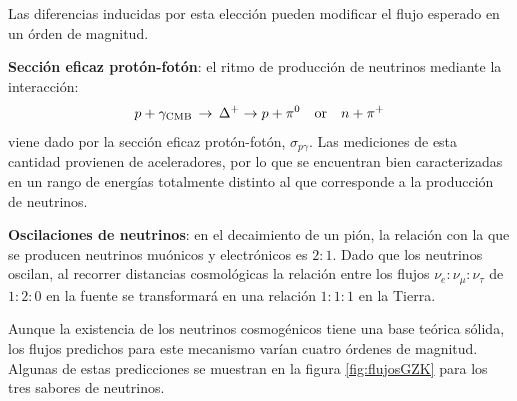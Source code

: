 	Las diferencias inducidas por esta elecci\'on pueden modificar el flujo esperado en un \'orden de magnitud.
	
	\textbf{Secci\'on eficaz protón-fot\'on}: el ritmo de producci\'on de neutrinos mediante la interacci\'on:
	\begin{displaymath}
	p + \gamma_{\rm CMB}\, \rightarrow\, \Delta^{+}  \rightarrow p +\pi^{0}\quad {\rm or}\quad n +\pi^{+}
	\end{displaymath}
	viene dado por la secci\'on eficaz prot\'on-fot\'on, $\sigma_{p\gamma}$.
	Las mediciones de esta cantidad provienen de aceleradores, por lo que se encuentran bien caracterizadas en un rango de energ\'ias totalmente distinto al que corresponde a la producci\'on de neutrinos.
	
	\textbf{Oscilaciones de neutrinos}: en el decaimiento de un pi\'on, la relaci\'on con la que se producen neutrinos mu\'onicos y electr\'onicos es $2:1$. 
	Dado que los neutrinos oscilan, al recorrer distancias cosmol\'ogicas la relaci\'on entre los flujos $\nu_e :\nu_\mu :\nu_\tau$ de $1:2:0$ en la fuente se transformar\'a en una relaci\'on $1:1:1$ en la Tierra.

	Aunque la existencia de los neutrinos cosmog\'enicos tiene una base teórica sólida, los flujos predichos para este mecanismo var\'ian cuatro \'ordenes de magnitud.
	Algunas de estas predicciones se muestran en la figura \ref{fig:flujosGZK} para los tres sabores de neutrinos.
	

